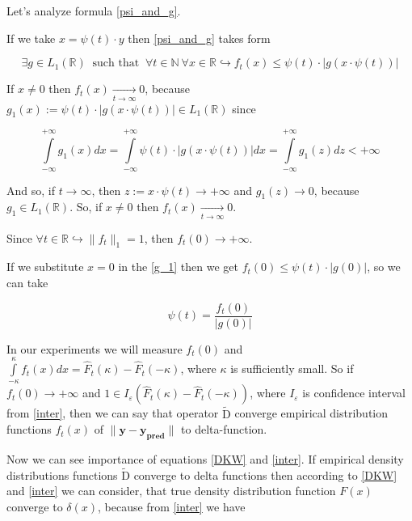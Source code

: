 \documentclass{article}
\begin{document}
    Let's analyze formula \eqref{psi_and_g}. 
    
    If we take $x = \psi(t) \cdot y$ then \eqref{psi_and_g} takes form 
    
    \begin{equation} \label{g_1}
            \exists g \in L_1(\mathbb{R}) ~\text{ such that }~ \forall t \in \mathbb{N} ~\forall x \in \mathbb{R} \hookrightarrow f_t\left(x\right) \leq \psi(t) \cdot |g(x \cdot \psi(t))|
    \end{equation}

    If $x \neq 0$ then $f_t(x) \underset{t \to \infty}{\longrightarrow} 0$, because $g_1(x) := \psi(t) \cdot |g(x \cdot \psi(t))| \in L_1(\mathbb{R})$ since

    \begin{equation*}
        \int\limits_{-\infty}^{+\infty} g_1(x) dx = \int\limits_{-\infty}^{+\infty} \psi(t) \cdot |g(x \cdot \psi(t))| dx = \int\limits_{-\infty}^{+\infty} g_1(z) dz < +\infty
    \end{equation*}

    And so, if $t \to \infty$, then $z := x \cdot \psi(t) \to +\infty$ and $g_1(z) \to 0$, because $g_1 \in L_1(\mathbb{R})$. So, if $x \neq 0$ then $f_t(x) \underset{t \to \infty}{\longrightarrow} 0$.

    Since $\forall t \in \mathbb{R} \hookrightarrow \|f_t\|_1 = 1$, then $f_t(0) \to +\infty$.

    If we substitute $x = 0$ in the \eqref{g_1} then we get $f_t(0) \leq \psi(t) \cdot |g(0)|$, so we can take

    \begin{equation}
        \psi(t) = \dfrac{f_t(0)}{|g(0)|}
    \end{equation}

    In our experiments we will measure $f_t(0)$ and $\int\limits_{-\kappa}^{\kappa}f_t(x)dx = \hat{F}_t(\kappa) - \hat{F}_t(-\kappa)$, where $\kappa$ is sufficiently small. So if $f_t(0) \to +\infty$ and $1 \in I_{\varepsilon}(\hat{F}_t(\kappa) - \hat{F}_t(-\kappa))$, where $I_{\varepsilon}$ is confidence interval from \eqref{inter}, then we can say that operator $\widetilde{\text{D}}$ converge empirical distribution functions $f_t(x)$ of $\|\mathbf{y} - \mathbf{y_{\text{pred}}}\|$ to delta-function.
    
    Now we can see importance of equations \eqref{DKW} and \eqref{inter}. If empirical density distributions functions $\widetilde{\text{D}}$ converge to delta functions then according to \eqref{DKW} and \eqref{inter} we can consider, that true density distribution function $F(x)$ converge to $\delta(x)$, because from \eqref{inter} we have
\end{document}
